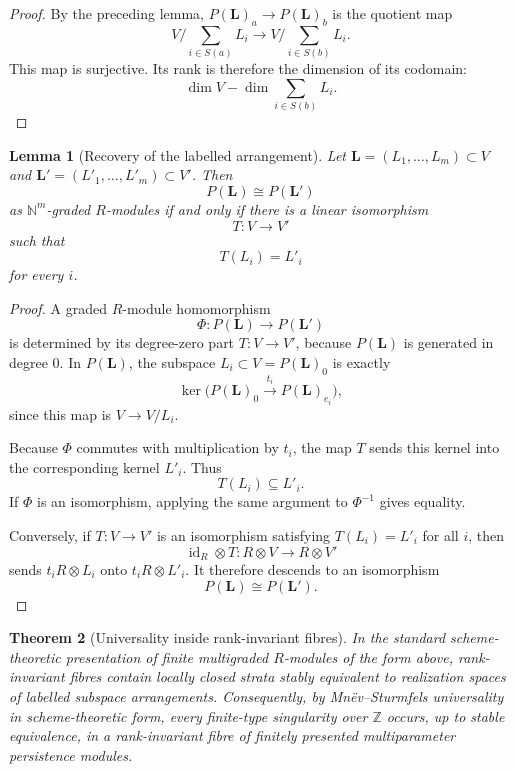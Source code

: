 \documentclass[11pt]{article}
\newtheorem{theorem}{Theorem}[section]
\newtheorem{lemma}[theorem]{Lemma}
\begin{document}
\begin{proof}
By the preceding lemma, \(P(\mathbf L)_a\to P(\mathbf L)_b\) is the quotient map
\[
V/\sum_{i\in S(a)}L_i
\longrightarrow
V/\sum_{i\in S(b)}L_i.
\]
This map is surjective. Its rank is therefore the dimension of its codomain:
\[
\dim V-\dim\sum_{i\in S(b)}L_i.
\]
\end{proof}

\begin{lemma}[Recovery of the labelled arrangement]
Let \(\mathbf L=(L_1,\ldots,L_m)\subset V\) and \(\mathbf L'=(L'_1,\ldots,L'_m)\subset V'\). Then
\[
P(\mathbf L)\cong P(\mathbf L')
\]
as \(\mathbb N^m\)-graded \(R\)-modules if and only if there is a linear isomorphism
\[
T:V\to V'
\]
such that
\[
T(L_i)=L'_i
\]
for every \(i\).
\end{lemma}

\begin{proof}
A graded \(R\)-module homomorphism
\[
\Phi:P(\mathbf L)\to P(\mathbf L')
\]
is determined by its degree-zero part \(T:V\to V'\), because \(P(\mathbf L)\) is generated in degree \(0\). In \(P(\mathbf L)\), the subspace \(L_i\subset V=P(\mathbf L)_0\) is exactly
\[
\ker\bigl(P(\mathbf L)_0\xrightarrow{t_i}P(\mathbf L)_{e_i}\bigr),
\]
since this map is \(V\to V/L_i\).

Because \(\Phi\) commutes with multiplication by \(t_i\), the map \(T\) sends this kernel into the corresponding kernel \(L'_i\). Thus
\[
T(L_i)\subseteq L'_i.
\]
If \(\Phi\) is an isomorphism, applying the same argument to \(\Phi^{-1}\) gives equality.

Conversely, if \(T:V\to V'\) is an isomorphism satisfying \(T(L_i)=L'_i\) for all \(i\), then
\[
\operatorname{id}_R\otimes T:R\otimes V\to R\otimes V'
\]
sends \(t_iR\otimes L_i\) onto \(t_iR\otimes L'_i\). It therefore descends to an isomorphism
\[
P(\mathbf L)\cong P(\mathbf L').
\]
\end{proof}

\begin{theorem}[Universality inside rank-invariant fibres]
In the standard scheme-theoretic presentation of finite multigraded \(R\)-modules of the form above, rank-invariant fibres contain locally closed strata stably equivalent to realization spaces of labelled subspace arrangements. Consequently, by Mnëv--Sturmfels universality in scheme-theoretic form, every finite-type singularity over \(\mathbb Z\) occurs, up to stable equivalence, in a rank-invariant fibre of finitely presented multiparameter persistence modules.
\end{theorem}
\end{document}
